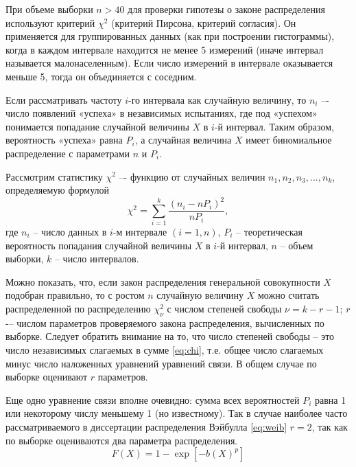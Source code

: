 При объеме выборки $n>40$ для проверки гипотезы о законе распределения используют критерий $\chi^2$ (критерий Пирсона, критерий согласия). Он применяется для группированных данных (как при построении гистограммы), когда в каждом интервале находится не менее 5 измерений (иначе интервал называется малонаселенным). Если число измерений в интервале оказывается меньше 5, тогда он объединяется с соседним.


Если рассматривать частоту $i$-го интервала как случайную величину, то  $n_i$ –- число появлений «успеха» в  независимых испытаниях, где под «успехом» понимается попадание случайной величины $X$ в $i$-й интервал. Таким образом, вероятность «успеха» равна $P_i$, а случайная величина $X$ имеет биномиальное распределение с параметрами $n$ и $P_i$.

Рассмотрим статистику $\chi^2$ –- функцию от случайных величин $n_1, n_2,n_3,...,n_k$, определяемую формулой
\begin{equation}\label{eq:chi}
  \chi^2=\sum\limits_{i=1}^k\frac{(n_i-nP_i)^2}{nP_i},
\end{equation}
где $n_i$ -- число данных в $i$-м интервале $(i=1,n)$, $P_i$ -- теоретическая вероятность попадания случайной величины $X$ в $i$-й интервал, $n$ -- объем выборки, $k$ -- число интервалов.

Можно показать, что, если закон распределения генеральной совокупности $X$ подобран правильно, то с ростом $n$ случайную величину $X$ можно считать распределенной по распределению $\chi_{\nu}^2$ с числом степеней свободы $\nu=k-r-1$; $r$ -– числом параметров проверяемого закона распределения, вычисленных по выборке. Следует обратить внимание на то, что число степеней свободы -- это число независимых слагаемых в сумме \eqref{eq:chi}, т.е. общее число слагаемых минус число наложенных уравнений уравнений связи. В общем случае по выборке оценивают $r$ параметров.

Еще одно уравнение связи вполне очевидно: сумма всех вероятностей $P_i$ равна 1 или некоторому числу меньшему 1 (но известному). Так в случае наиболее часто рассматриваемого в диссертации распределения Вэйбулла \eqref{eq:weib} $r=2$, так как по выборке оцениваются два параметра распределения.
\begin{equation} \label{eq:weib}
F(X)=1-\exp \left[-b\left(X \right)^{p} \right]
\end{equation}

